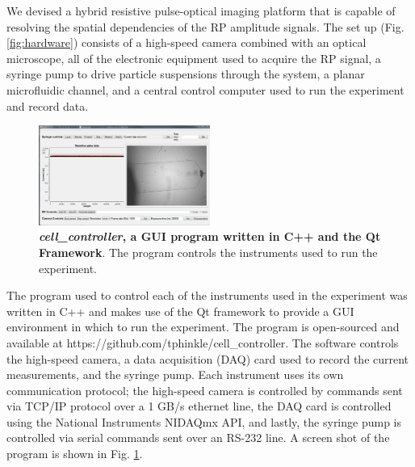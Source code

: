 	
		We devised a hybrid resistive pulse-optical imaging platform that is capable of resolving the spatial dependencies of the RP amplitude signals. The set up (Fig. \ref{fig:hardware}) consists of a high-speed camera combined with an optical microscope, all of the electronic equipment used to acquire the RP signal, a syringe pump to drive particle suspensions through the system, a planar microfluidic channel, and a central control computer used to run the experiment and record data.
		
		\begin{figure}
			\includegraphics[width=0.5\textwidth]{cellcontroller.png}
			\caption{\textbf{\textit{cell\_controller}, a GUI program written in C++ and the Qt Framework}. The program controls the instruments used to run the experiment.}
			\label{fig:cellcontroller}
		\end{figure}

		
		The program used to control each of the instruments used in the experiment was written in C++ and makes use of the Qt framework to provide a GUI environment in which to run the experiment. The program is open-sourced and available at https://github.com/tphinkle/cell\_controller. The software controls the high-speed camera, a data acquisition (DAQ) card used to record the current measurements, and the syringe pump. Each instrument uses its own communication protocol; the high-speed camera is controlled by commands sent via TCP/IP protocol over a 1 GB/s ethernet line, the DAQ card is controlled using the National Instruments NIDAQmx API, and lastly, the syringe pump is controlled via serial commands sent over an RS-232 line. A screen shot of the program is shown in Fig. \ref{fig:cellcontroller}.
		
